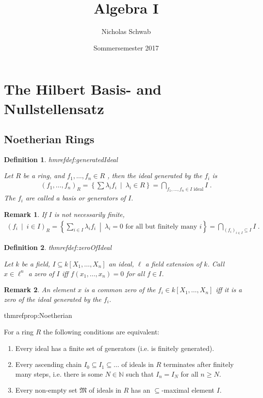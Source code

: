 \documentclass[DIV=14,parskip=full,pointednumbers]{scrartcl}
\title{Algebra I}
\author{Nicholas Schwab}
\date{Sommersemester 2017}
\newenvironment{rmnumerate}{\begin{enumerate}[label={\upshape(\roman*)}]}{\end{enumerate}}
\theoremstyle{cthm}
\theoremstyle{cvarthm}
\theoremstyle{cdef}
\newtheorem{defi}{Definition}[subsection]
\newtheorem{rem}{Remark}[subsection]
\newcommand{\lbl}[1]{
	\label{#1}
	\edef\dummy{\curthm}
	\expandafter\xdef\csname thmref#1\endcsname{\dummy}
}
\newcommand{\IN}{\mathbb{N}}
\newcommand{\st}{\ \middle|\ }
\begin{document}
\maketitle
\tableofcontents
\section{The Hilbert Basis- and Nullstellensatz}
\subsection{Noetherian Rings}
\begin{defi}\lbl{def:generatedIdeal}
 Let $R$ be a ring, and $f_1,\ldots, f_n\in R$ , then  the \emph{ideal generated by the $f_i$} is
 \begin{align*}\left( f_1,\ldots,  f_n\right)_R = \left\{\sum\lambda_i f_i\st\lambda_i \in R\right\} = \bigcap_{f_1,\ldots,f_n\in I\text{ ideal}} I\;.
 \end{align*}
The $f_i$ are called a \emph{basis} or \emph{generators} of $I$. 
\end{defi}
\begin{rem}
 If $I$ is not necessarily finite, 
 \begin{align*}
\left( f_i\st i\in I\right)_R = \left\{\sum_{i\in I} \lambda_i f_i \st\lambda_i = 0 \text{ for all but finitely many } i\right\} = \bigcap_{(f_i)_{i\in I}\subseteq I} I\;.
\end{align*}
\end{rem}
\begin{defi}\lbl{def:zeroOfIdeal}
 Let $k$ be a field, $I\subseteq k[X_1,\ldots, X_n]$ an ideal, $\ell$ a field extension of $k$. Call $x\in \ell^n$ a \emph{zero} of $I$ iff $f(x_1,\ldots,x_n) = 0$ for all $f\in I$. 
\end{defi}
\begin{rem}
 An element $x$ is a common zero of the $f_i\in k[X_1,\ldots,X_n]$ iff it is a zero of the ideal generated by the $f_i$.
\end{rem}
\begin{prop}\lbl{prop:Noetherian}
 For a ring $R$ the following conditions are equivalent:
 \begin{rmnumerate}
  \item Every ideal has a finite set of generators (i.e. is finitely generated).
  \item Every ascending chain $I_0 \subseteq I_1 \subseteq \ldots$ of ideals in $R$ terminates after finitely many steps, i.e. there is some $N\in\IN$ such that $I_n=I_N$ for all $n\geq N$.
  \item Every non-empty set $\mathfrak{M}$ of ideals in $R$ has an $\subseteq$-maximal element $I$. 
 \end{rmnumerate}
\end{prop}
\end{document}
